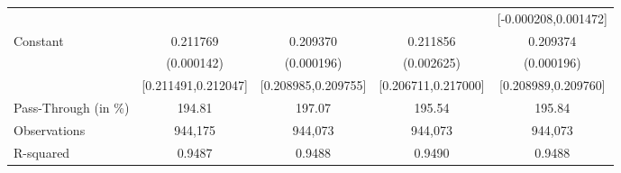 {\begin{tabular}{l*{4}{c}}
                    &                     &                     &                     &[-0.000208,0.001472]         \\
Constant            &    0.211769\sym{***}&    0.209370\sym{***}&    0.211856\sym{***}&    0.209374\sym{***}\\
                    &  (0.000142)         &  (0.000196)         &  (0.002625)         &  (0.000196)         \\
                    &[0.211491,0.212047]         &[0.208985,0.209755]         &[0.206711,0.217000]         &[0.208989,0.209760]         \\
\midrule
Pass-Through (in \%)&      194.81         &      197.07         &      195.54         &      195.84         \\
Observations        &     944,175         &     944,073         &     944,073         &     944,073         \\
R-squared           &      0.9487         &      0.9488         &      0.9490         &      0.9488         \\
\bottomrule
\end{tabular}
}
